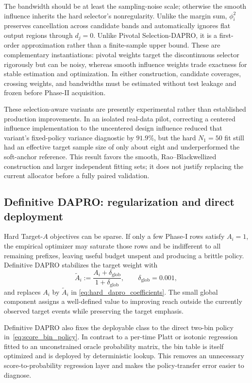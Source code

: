 The bandwidth should be at least the sampling-noise scale; otherwise the
smooth influence inherits the hard selector's nonregularity.  Unlike the
margin sum, $\phi_i^2$ preserves cancellation across candidate bands and
automatically ignores flat output regions through $d_j=0$.  Unlike Pivotal
Selection-DAPRO, it is a first-order approximation rather than a finite-sample
upper bound.  These are complementary instantiations: pivotal weights target
the discontinuous selector rigorously but can be noisy, whereas smooth
influence weights trade exactness for stable estimation and optimization.  In
either construction, candidate coverages, crossing weights, and bandwidths
must be estimated without test leakage and frozen before Phase-II acquisition.

These selection-aware variants are presently experimental rather than
established production improvements.  In an isolated real-data pilot,
correcting a centered influence implementation to the uncentered design
influence reduced that variant's fixed-policy variance diagnostic by $91.9\%$,
but the hard $N_1=50$ fit still had an effective target sample size of only
about eight and underperformed the soft-anchor reference.  This result favors
the smooth, Rao--Blackwellized construction and larger independent fitting
sets; it does not justify replacing the current allocator before a fully
paired validation.

\subsection{Definitive DAPRO: regularization and direct deployment}

Hard Target-$A$ objectives can be sparse.  If only a few Phase-I rows satisfy
$A_i=1$, the empirical optimizer may saturate those rows and be indifferent
to all remaining prefixes, leaving useful budget unspent and producing a
brittle policy.  Definitive DAPRO stabilizes the target weight with
\begin{equation}
    \widetilde A_i
    :=\frac{A_i+\delta_{\mathrm{glob}}}
    {1+\delta_{\mathrm{glob}}},
    \qquad \delta_{\mathrm{glob}}=0.001,
    \label{eq:definitive_regularization}
\end{equation}
and replaces $A_i$ by $\widetilde A_i$ in
\eqref{eq:hard_dapro_coefficients}.  The small global component assigns a
well-defined value to improving reach outside the currently observed target
events while preserving the target emphasis.

Definitive DAPRO also fixes the deployable class to the direct two-bin policy
in~\eqref{eq:score_bin_policy}.  In contrast to a per-time Platt or isotonic
regression fitted to an unconstrained oracle probability matrix, the bin
table is itself optimized and is deployed by deterministic lookup.  This
removes an unnecessary score-to-probability regression layer and makes the
policy-transfer error easier to diagnose.

